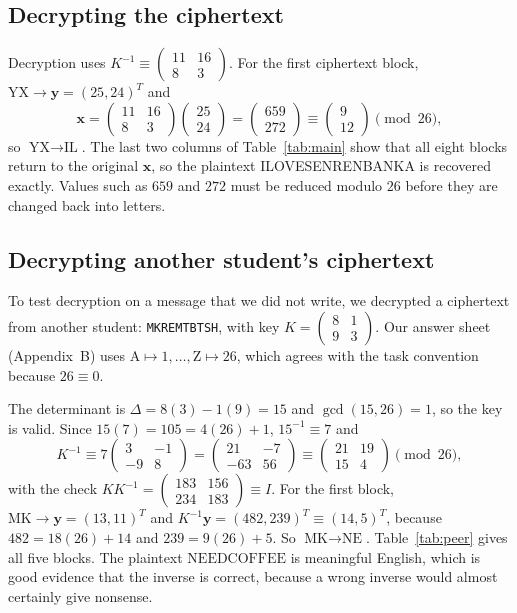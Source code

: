 \documentclass[11pt,a4paper]{article}
\newcommand{\vect}[1]{\begin{pmatrix}#1\end{pmatrix}}
\newcommand{\smat}[1]{\left(\begin{smallmatrix}#1\end{smallmatrix}\right)}
\newcommand{\x}{\mathbf{x}}   %
\newcommand{\y}{\mathbf{y}}   %
\theoremstyle{plain}
\theoremstyle{definition}
\begin{document}
\subsection{Decrypting the ciphertext}

Decryption uses $K^{-1}\equiv\smat{11&16\\8&3}$. For the first ciphertext block, $\text{YX}\longrightarrow\y=(25,24)^T$ and
\[
\x=\vect{11&16\\8&3}\vect{25\\24}=\vect{659\\272}\equiv\vect{9\\12}\pmod{26},
\]
so $\text{YX}\longrightarrow\text{IL}$. The last two columns of Table~\ref{tab:main} show that all eight blocks return to the original $\x$, so the plaintext ILOVESENRENBANKA is recovered exactly. Values such as $659$ and $272$ must be reduced modulo $26$ before they are changed back into letters.

\subsection{Decrypting another student's ciphertext}\label{sec:peer}

To test decryption on a message that we did not write, we decrypted a ciphertext from another student: \texttt{MKREMTBTSH}, with key $K=\smat{8&1\\9&3}$. Our answer sheet (Appendix~B) uses $\text{A}\mapsto1,\ldots,\text{Z}\mapsto26$, which agrees with the task convention because $26\equiv0$.

The determinant is $\Delta=8(3)-1(9)=15$ and $\gcd(15,26)=1$, so the key is valid. Since $15(7)=105=4(26)+1$, $15^{-1}\equiv7$ and
\[
K^{-1}\equiv7\vect{3&-1\\-9&8}=\vect{21&-7\\-63&56}\equiv\vect{21&19\\15&4}\pmod{26},
\]
with the check $KK^{-1}=\smat{183&156\\234&183}\equiv I$. For the first block, $\text{MK}\longrightarrow\y=(13,11)^T$ and $K^{-1}\y=(482,239)^T\equiv(14,5)^T$, because $482=18(26)+14$ and $239=9(26)+5$. So $\text{MK}\longrightarrow\text{NE}$. Table~\ref{tab:peer} gives all five blocks. The plaintext $\text{NEEDCOFFEE}$ is meaningful English, which is good evidence that the inverse is correct, because a wrong inverse would almost certainly give nonsense.
\end{document}
